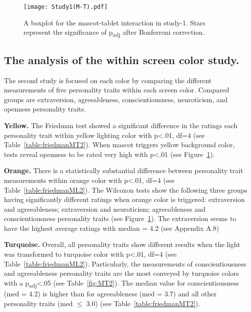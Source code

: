 \begin{figure}[hbt!]
    \centering
    \texttt{[image: Study1(M-T).pdf]}
    \caption[]{A boxplot for the mascot-tablet interaction in study-1.
    Stars represent the significance of p\textsubscript{adj} after Bonferroni correction.\footnotemark}
    \label{fig:MT1}
\end{figure}
\subsection{The analysis of the within screen color study.}
\label{subsec:MTstudy2}
The second study is focused on each color by comparing the different measurements of five
personality traits within each screen color.
Compared groups are extraversion, agreeableness, conscientiousness, neuroticism, and openness personality traits.

\par\textbf{Yellow.}
The Friedman test showed a significant difference in the ratings each personality trait
within yellow lighting color with p<.01, df=4 (see Table~\ref{table:friedmanMT2}).
When mascot triggers yellow background color, tests reveal openness
to be rated very high with p<.01 (see Figure~\ref{fig:MT1}).

\par\textbf{Orange.}
There is a statistically substantial difference between personality trait measurements within
orange color with p<.01, df=4 (see Table~\ref{table:friedmanML2}).
The Wilcoxon tests show the following three groups having significantly different ratings when orange
color is triggered: extraversion and agreeableness;
extraversion and neuroticism;
agreeableness and conscientiousness personality traits (see Figure~\ref{fig:MT1}).
The extraversion seems to have the highest average ratings with median = 4.2 (see Appendix A.8)

\par\textbf{Turquoise.}
Overall, all personality traits show different results when the light was transformed to turquoise color
with p<.01, df=4 (see Table~\ref{table:friedmanML2}).
Particularly, the measurements of conscientiousness and agreeableness personality traits are the most
conveyed by turquoise colors with a p\textsubscript{adj}<.05 (see Table~\ref{fig:MT2}).
The median value for conscientiousness (med = 4.2) is higher than for agreeableness
(med = 3.7) and all other personality traits (med $\leq$ 3.0) (see Table~\ref{table:friedmanMT2}).

